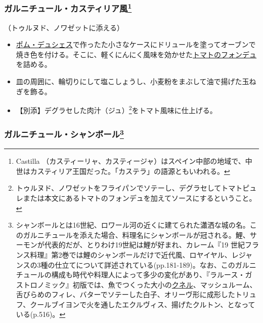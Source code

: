 \begin{recette}
{\subsubsection[ガルニチュール・カスティリア風]{\texorpdfstring{ガルニチュール・カスティリア風\footnote{Castilla
  （カスティーリャ、カスティージャ）はスペイン中部の地域で、中世はカスティリア王国だった。「カステラ」の語源ともいわれる。}}{ガルニチュール・カスティリア風}}\label{garniture-castillane}}



（トゥルヌド、ノワゼットに添える）

\begin{itemize}
\item
  \protect\hyperlink{pommes-de-terre-duchesse}{ポム・デュシェス}で作ったた小さなケースにドリュールを塗ってオーブンで焼き色を付ける。そこに、軽くにんにく風味を効かせた\protect\hyperlink{portugaise}{トマトのフォンデュ}を詰める。
\item
  皿の周囲に、輪切りにして塩こしょうし、小麦粉をまぶして油で揚げた玉ねぎを飾る。
\item
  【別添】デグラセした肉汁（ジュ）\footnote{トゥルヌド、ノワゼットをフライパンでソテーし、デグラセしてトマトピュレまたは本文にあるトマトのフォンデュを加えてソースにするということ。}をトマト風味に仕上げる。
\end{itemize}

\atoaki{}

\hypertarget{garniture-chambord}{%
\subsubsection[ガルニチュール・シャンボール]{\texorpdfstring{ガルニチュール・シャンボール\footnote{シャンボールとは16世紀、ロワール河の近くに建てられた瀟洒な城の名。このガルニチュールを添えた場合、料理名にシャンボールが冠される。鯉、サーモンが代表的だが、とりわけ19世紀は鯉が好まれ、カレーム『19
  世紀フランス料理』第2巻では鯉のシャンボールだけで近代風、ロヤイヤル、レジャンスの3種の仕立てについて詳述されている(pp.181-189)。なお、このガルニチュールの構成も時代や料理人によって多少の変化があり、『ラルース・ガストロノミック』初版では、魚でつくった大小の\protect\hyperlink{quenelles}{クネル}、マッシュルーム、舌びらめのフィレ、バターでソテーした白子、オリーヴ形に成形したトリュフ、クールブイヨンで火を通したエクルヴィス、揚げたクルトン、となっている(p.516)。}}{ガルニチュール・シャンボール}}\label{garniture-chambord}}


\end{recette}
